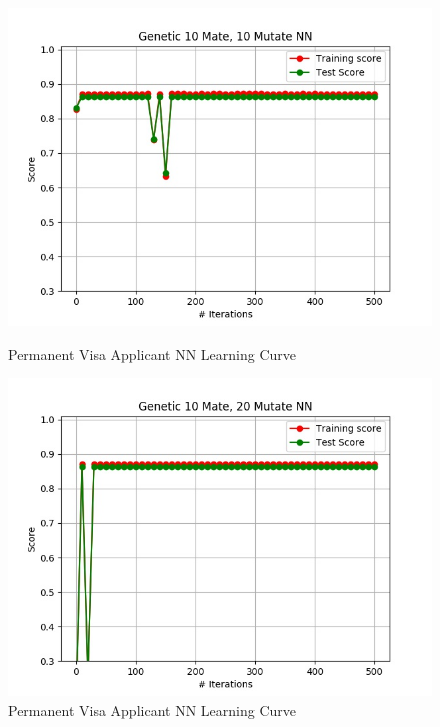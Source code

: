 \documentclass[h]{article}
\begin{document}
  \begin{figure}[H]
      \includegraphics[width=1\textwidth,keepaspectratio]{genetic_10_mate,_10_mutate_nn.jpg} 
      \caption*{Permanent Visa Applicant NN Learning Curve} 
   \endminipage\hfill
      \includegraphics[width=1\textwidth,keepaspectratio]{genetic_10_mate,_20_mutate_nn.jpg} 
      \caption*{Permanent Visa Applicant NN Learning Curve} 
   \endminipage\hfill
\end{figure}
\end{document}
